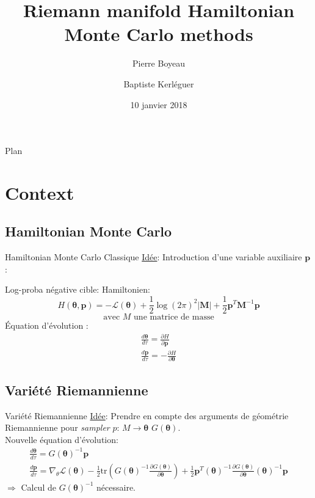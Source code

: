\documentclass{beamer}
\title{Riemann manifold Hamiltonian Monte Carlo methods}
\author{Pierre Boyeau \and Baptiste Kerl\'eguer\\}\institute{École Normale Supérieure Paris-Saclay}
\date{10 janvier 2018}
\begin{document}
  \begin{frame}
  \titlepage
  \end{frame}
  
  \begin{frame}{Plan}
\tableofcontents
 \end{frame}
  
  \section{Context}
  
  \subsection{Hamiltonian Monte Carlo}  
  \begin{frame}{Hamiltonian Monte Carlo Classique}
  \underline{Idée}: Introduction d'une variable auxiliaire $\bm{p}$: 
  
  
  Log-proba négative cible: Hamiltonien: $$ H(\bm{\theta},\bm{p}) = -\mathcal{L}(\bm{\theta}) + \frac{1}{2} \log{(2\pi)^2|\bm{M}|} +\frac{1}{2} \bm{p}^T\bm{M}^{-1}\bm{p} \label{Hamiltonian}$$
  $$ \text{avec } M \text{ une matrice de masse}$$
  \'Equation d'\'evolution : 
  \begin{eqnarray}
  \frac{d\bm{\theta}}{d\tau} = \frac{\partial H}{\partial \bm{p}} \\
  \frac{d\bm{p}}{d\tau} = -\frac{\partial H}{\partial \bm{\theta}}
  \label{evolution}
  \end{eqnarray}  
  
  \end{frame}
  
  \subsection{Variété Riemannienne}
  \begin{frame}{Variété Riemannienne}
  \underline{Idée}: Prendre en compte des arguments de géométrie Riemannienne pour \textit{sampler} $p$:
  $M \rightarrow \bm{\theta}$ $G(\bm{\theta})$.\\
  Nouvelle équation d'évolution:
  \begin{eqnarray}
  \frac{d\bm{\theta}}{d\tau} = G(\bm{\theta})^{-1}\bm{p} \\
  \frac{d\bm{p}}{d\tau} = \nabla_\theta\mathcal{L}(\bm{\theta})-\frac{1}{2}\text{tr}\left(G(\bm{\theta})^{-1}\frac{\partial G(\bm{\theta})}{\partial \bm{\theta}} \right)+\frac{1}{2}\bm{p}^T(\bm{\theta})^{-1}\frac{\partial G(\bm{\theta})}{\partial \bm{\theta}}(\bm{\theta})^{-1}\bm{p}
  \label{evolution}
  \end{eqnarray}
  $\Rightarrow$ Calcul de $G(\bm{\theta})^{-1}$ nécessaire.
  \end{frame}
  
\end{document}
